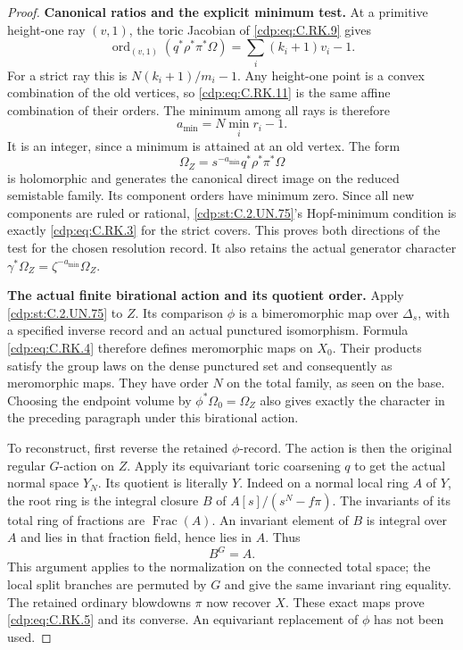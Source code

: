 \begin{proof}
\par\medskip\noindent\textbf{Canonical ratios and the explicit minimum test.}
At a primitive height-one ray $(v,1)$,
the toric Jacobian of \eqref{cdp:eq:C.RK.9} gives
\[
 \operatorname{ord}_{(v,1)}(q^*\rho^*\pi^*\Omega)
                 =\sum_i(k_i+1)v_i-1.
\tag{C.RK.11}\label{cdp:eq:C.RK.11}
\]
For a strict ray this is
$N(k_i+1)/m_i-1$. Any height-one
point is a convex combination of the
old vertices, so \eqref{cdp:eq:C.RK.11} is the
same affine combination of their
orders. The minimum among all rays is
therefore
\[
                  a_{\min}=N\min_i r_i-1.
\tag{C.RK.12}\label{cdp:eq:C.RK.12}
\]
It is an integer, since a minimum is
attained at an old vertex. The form
\[
            \Omega_Z=s^{-a_{\min}}
                             q^*\rho^*\pi^*\Omega
\tag{C.RK.13}\label{cdp:eq:C.RK.13}
\]
is holomorphic and generates the
canonical direct image on the reduced
semistable family. Its component
orders have minimum zero. Since all
new components are ruled or rational,
\ref{cdp:st:C.2.UN.75}'s Hopf-minimum condition is
exactly \eqref{cdp:eq:C.RK.3} for the strict covers.
This proves both directions of the
test for the chosen resolution record.
It also retains the actual generator
character
$\gamma^*\Omega_Z=\zeta^{-a_{\min}}\Omega_Z$.

\par\medskip\noindent\textbf{The actual finite birational action and its quotient order.}
Apply \ref{cdp:st:C.2.UN.75} to $Z$. Its comparison
$\phi$ is a bimeromorphic map over
$\Delta_s$, with a specified inverse
record and an actual punctured
isomorphism. Formula \eqref{cdp:eq:C.RK.4}
therefore defines meromorphic maps
on $X_0$. Their products satisfy
the group laws on the dense
punctured set and consequently
as meromorphic maps. They have
order $N$ on the total family,
as seen on the base. Choosing
the endpoint volume by
$\phi^*\Omega_0=\Omega_Z$ also
gives exactly the character in
the preceding paragraph under
this birational action.

To reconstruct, first reverse
the retained $\phi$-record.
The action is then the original
regular $G$-action on $Z$.
Apply its equivariant toric
coarsening $q$ to get the actual
normal space $Y_N$. Its quotient
is literally $Y$. Indeed on a
normal local ring $A$ of $Y$,
the root ring is the integral
closure $B$ of
$A[s]/(s^N-f\pi)$. The invariants
of its total ring of fractions are
$\operatorname{Frac}(A)$.
An invariant element of $B$ is
integral over $A$ and lies in
that fraction field, hence lies
in $A$. Thus
\[
                              B^G=A.
\tag{C.RK.14}\label{cdp:eq:C.RK.14}
\]
This argument applies to the
normalization on the connected
total space; the local split
branches are permuted by $G$
and give the same invariant
ring equality. The retained
ordinary blowdowns $\pi$ now
recover $X$. These exact maps
prove \eqref{cdp:eq:C.RK.5} and its converse.
An equivariant replacement of
$\phi$ has not been used.


\end{proof}
